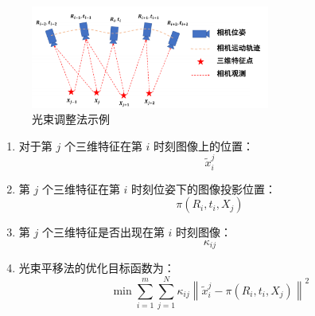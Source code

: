 \documentclass[../main.tex]{subfiles}
\begin{document}
\begin{enumerate}
\begin{itemize}
\begin{enumerate}
\begin{itemize}
\begin{itemize}
\begin{itemize}
\begin{figure}[H]
                                            \centering
                                            \includegraphics[width=0.7\textwidth]{images/ba2.png}
                                            \caption{光束调整法示例}
                                        \end{figure}
                                        \begin{small}\kaishu
                                        \begin{enumerate}
                                            \item 对于第 $j$ 个三维特征在第 $i$ 时刻图像上的位置：
                                            \[
                                            \tilde{x}_i^j
                                            \]
                                            \item 第 $j$ 个三维特征在第 $i$ 时刻位姿下的图像投影位置：
                                            \[
                                            \pi(R_i, t_i, X_j)
                                            \]
                                            \item 第 $j$ 个三维特征是否出现在第 $i$ 时刻图像：
                                            \[
                                            \kappa_{ij}
                                            \]
                                            \item 光束平移法的优化目标函数为：
                                            \[
                                            \min \sum_{i=1}^{m} \sum_{j=1}^{N} \kappa_{ij} \left\| \tilde{x}_i^j - \pi(R_i, t_i, X_j) \right\|^2
                                            \]
                                        \end{enumerate}
                                        \end{small}
                                    \end{itemize}


                        \end{itemize}
                        \end{itemize}
                \end{enumerate}
        \end{itemize}
\end{enumerate}
\end{document}
